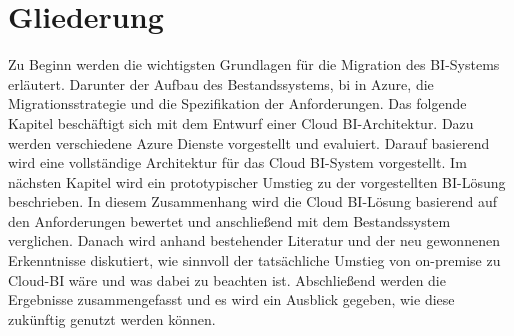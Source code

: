 \section{Gliederung} \label{sec:intro:struktur}
Zu Beginn werden die wichtigsten Grundlagen für die Migration des BI-Systems erläutert. Darunter der Aufbau des Bestandssystems, \ac{bi} in Azure, die Migrationsstrategie und die Spezifikation der Anforderungen. Das folgende Kapitel beschäftigt sich mit dem Entwurf einer Cloud BI-Architektur. Dazu werden verschiedene Azure Dienste vorgestellt und evaluiert. Darauf basierend wird eine vollständige Architektur für das Cloud BI-System vorgestellt. Im nächsten Kapitel wird ein prototypischer Umstieg zu der vorgestellten BI-Lösung beschrieben. In diesem Zusammenhang wird die Cloud BI-Lösung basierend auf den Anforderungen bewertet und anschließend mit dem Bestandssystem verglichen. Danach wird anhand bestehender Literatur und der neu gewonnenen Erkenntnisse diskutiert, wie sinnvoll der tatsächliche Umstieg von on-premise zu Cloud-BI wäre und was dabei zu beachten ist. Abschließend werden die Ergebnisse zusammengefasst und es wird ein Ausblick gegeben, wie diese zukünftig genutzt werden können.